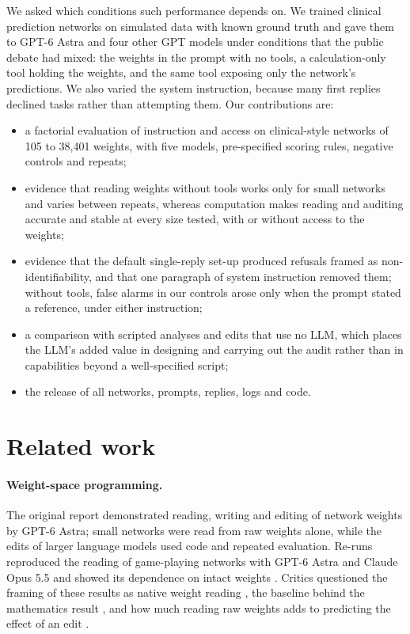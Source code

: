 \documentclass[11pt]{article}
\newcommand{\astra}{GPT-6 Astra}
\begin{document}
We asked which conditions such performance depends on. We trained clinical prediction networks on simulated data with known ground truth and gave them to \astra{} and four other GPT models under conditions that the public debate had mixed: the weights in the prompt with no tools, a calculation-only tool holding the weights, and the same tool exposing only the network's predictions. We also varied the system instruction, because many first replies declined tasks rather than attempting them. Our contributions are:
\begin{itemize}
\item a factorial evaluation of instruction and access on clinical-style networks of 105 to 38,401 weights, with five models, pre-specified scoring rules, negative controls and repeats;
\item evidence that reading weights without tools works only for small networks and varies between repeats, whereas computation makes reading and auditing accurate and stable at every size tested, with or without access to the weights;
\item evidence that the default single-reply set-up produced refusals framed as non-identifiability, and that one paragraph of system instruction removed them; without tools, false alarms in our controls arose only when the prompt stated a reference, under either instruction;
\item a comparison with scripted analyses and edits that use no LLM, which places the LLM's added value in designing and carrying out the audit rather than in capabilities beyond a well-specified script;
\item the release of all networks, prompts, replies, logs and code.
\end{itemize}

\section{Related work}

\paragraph{Weight-space programming.} The original report \cite{takehi2026} demonstrated reading, writing and editing of network weights by \astra{}; small networks were read from raw weights alone, while the edits of larger language models used code and repeated evaluation. Re-runs reproduced the reading of game-playing networks with \astra{} and Claude Opus 5.5 and showed its dependence on intact weights \cite{turing2026}. Critics questioned the framing of these results as native weight reading \cite{honnibal2026,goedecke2026}, the baseline behind the mathematics result \cite{toledo2026}, and how much reading raw weights adds to predicting the effect of an edit \cite{singh2026}.
\end{document}
